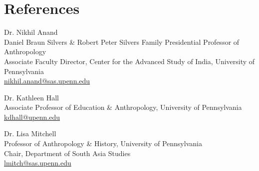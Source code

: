 \documentclass[11pt,letterpaper]{report}
\begin{document}
    \section*{References}
    \begin{tablist}
        \item[] Dr. Nikhil Anand\\
        Daniel Braun Silvers \& Robert Peter Silvers Family Presidential Professor of Anthropology\\
        Associate Faculty Director, Center for the Advanced Study of India, University of Pennsylvania\\
        \href{mailto:nikhil.anand@sas.upenn.edu}{nikhil.anand@sas.upenn.edu}
        \item[] Dr. Kathleen Hall\\
        Associate Professor of Education \& Anthropology, University of Pennsylvania\\
        \href{mailto:kdhall@upenn.edu}{kdhall@upenn.edu}
        \item[] Dr. Lisa Mitchell\\
        Professor of Anthropology \& History, University of Pennsylvania\\
        Chair, Department of South Asia Studies\\
        \href{mailto:lmitch@sas.upenn.edu}{lmitch@sas.upenn.edu}
    \end{tablist}
\end{document}
